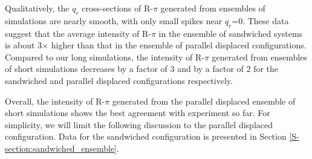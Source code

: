 \documentclass[journal=jpcbfk,manuscript=article]{achemso}
\begin{document}
  Qualitatively, the $q_r$ cross-sections of R-$\pi$ generated from ensembles of
  simulations are nearly smooth, with only small spikes near $q_r$=0. These data
  suggest that the average intensity of R-$\pi$ in the ensemble of sandwiched 
  systems is about 3$\times$ higher than that in the ensemble of parallel displaced
  configurations. Compared to our long simulations, the intensity of R-$\pi$
  generated from ensembles of short simulations decreases by a factor of 3
  and by a factor of 2 for the sandwiched and parallel displaced configurations respectively. 

  Overall, the intensity of R-$\pi$ generated from the parallel displaced 
  ensemble of short simulations shows the best agreement with experiment so far. For simplicity, 
  we will limit the following discussion to the parallel displaced configuration.
  Data for the sandwiched configuration is presented in Section 
  \ref{S-section:sandwiched_ensemble}.
\end{document}
